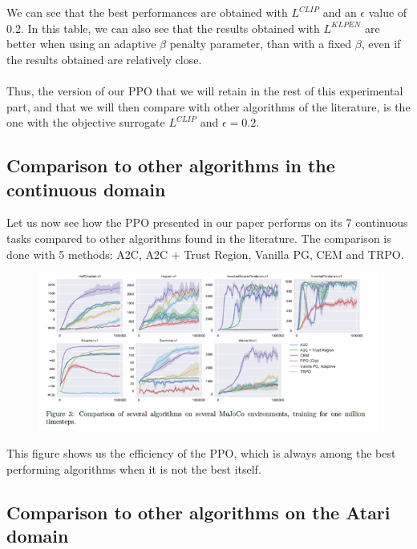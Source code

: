\documentclass{article}
\begin{document}
We can see that the best performances are obtained with $L^{CLIP}$ and an $\epsilon$ value of 0.2. 
In this table, we can also see that the results obtained with $L^{KLPEN}$ are better when using an adaptive $\beta$ penalty parameter, than with a fixed $\beta$, even if the results obtained are relatively close. 
\\ \\
Thus, the version of our PPO that we will retain in the rest of this experimental part, and that we will then compare with other algorithms of the literature, is the one  with the objective surrogate $L^{CLIP}$ and $\epsilon = 0.2$.

\subsection{Comparison to other algorithms in the continuous domain}

Let us now see how the PPO presented in our paper performs on its 7 continuous tasks compared to other algorithms found in the literature. The comparison is done with 5 methods: A2C, A2C + Trust Region, Vanilla PG, CEM and TRPO. 

\begin{figure}[H]
\centering
\includegraphics[scale=0.8]{img/perf2.png}
\end{figure}

This figure shows us the efficiency of the PPO, which is always among the best performing algorithms when it is not the best itself. 

\subsection{Comparison to other algorithms on the Atari domain}
\end{document}
